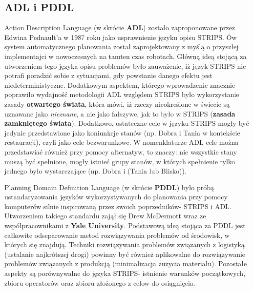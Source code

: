     \subsection{ADL i PDDL}
    Action Description Language (w skrócie \textbf{ADL}) zostało zaproponowane przez Edwina Pednault'a  w 1987 roku jako usprawnienie 
    języku opisu STRIPS. Ów system automatycznego planowania został zaprojektowany z myślą o przyszłej implementajci w nowoczesnych na tamten czas robotach.
    Główną ideą stojącą za utworzeniem tego języka opisu problemów było zauważenie, iż język STRIPS nie potrafi poradzić sobie z sytuacjami, gdy
    powstanie danego efektu jest niedeterministyczne. Dodatkowym aspektem, którego wprowadzenie znacznie poprawiło wydajność metodologii ADL względem STRIPS 
    było wykorzystanie zasady \textbf{otwartego świata}, która mówi, iż rzeczy nieokreślone w świecie są uznawane jako \textit{nieznane}, a nie jako 
    fałszywe, jak to było w STRIPS (\textbf{zasada zamkniętego świata}). Dodatkowo, ostateczne cele w języku STRIPS mogły być jedynie przedstawione jako 
    koniunkcje stanów (np. Dobra i Tania w kontekście restauracji), czyli jako cele bezwarunkowe. 
    W nomenklaturze ADL cele można przedstawiać również przy pomocy alternatyw, to znaczy: 
    nie wszystkie stany muszą być spełnione, mogły istnieć grupy stanów, w których spełnienie tylko jednego było wystarczające (np. Dobra i (Tania lub Blisko)). 

    Planning Domain Definition Language (w skrócie \textbf{PDDL}) było próbą ustandaryzowania języków wykorzystywanych 
    do planowania przy pomocy komputerów silnie inspirowaną przez swoich poprzedników- STRIPS i ADL. 
    Utworzeniem takiego standardu zajął się Drew McDermott wraz ze współpracownikami z \textbf{Yale University}.
    Podstawową ideą stojąca za PDDL jest całkowite odseparowanie metod rozwiązywania problemów od środowisk, w których się 
    znajdują. Techniki rozwiązywania problemów związanych z logistyką (ustalanie najkrótszej drogi) powinny być również aplikowalne do rozwiązywanie problemów 
    związanych z produkcją (minimalizacja zużycia materiału). Pozostałe aspekty są porównywalne do języka STRIPS- 
    istnienie warunków początkowych, zbioru operatorów oraz zbioru złożonego z celow do osiągnięcia.



